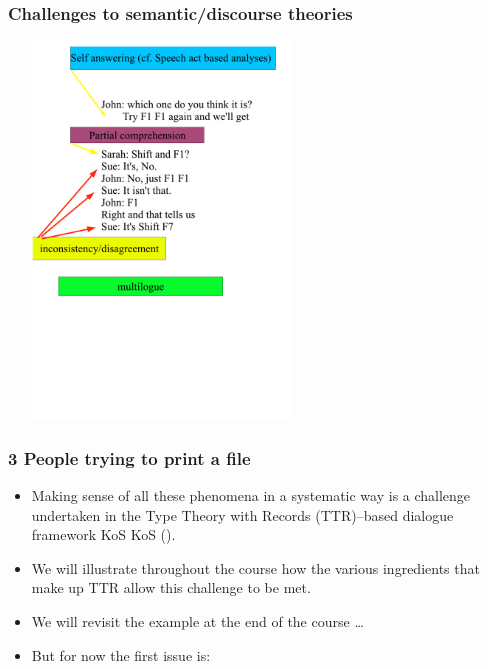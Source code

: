 \documentclass{beamer}
\newcommand{\bit}{\begin{itemize}}
\newcommand{\eit}{\end{itemize}}
\begin{document}
\begin{frame}\frametitle{Challenges to semantic/discourse theories}

\includegraphics[height=10cm,width=8cm]{challenges1.pdf}




\end{frame}

\begin{frame}\frametitle{3 People trying to print a file}

\bit

\item Making sense of all
these phenomena in a systematic way is a challenge undertaken in the
Type Theory with Records (TTR)--based dialogue framework KoS 
KoS
(\cite{ginzburg-iwcs94,larsson-diss,gc-lp02,purver-diss,raquel-diss,ginzburg-buke}). 


\item We will illustrate throughout the course how the
various ingredients that make up TTR allow this challenge to be met.

\item We will revisit the example at the end of the course \ldots

\item But for now the first issue is: 
\eit


\end{frame}
\end{document}

